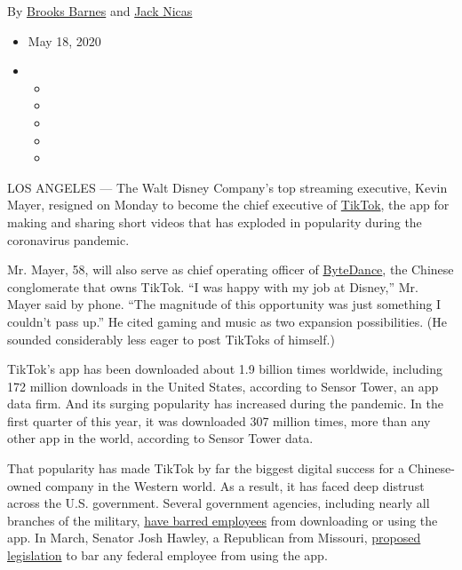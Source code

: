 By \href{https://www.nytimes.com/by/brooks-barnes}{Brooks Barnes} and
\href{https://www.nytimes.com/by/jack-nicas}{Jack Nicas}

\begin{itemize}
\item
  May 18, 2020
\item
  \begin{itemize}
  \item
  \item
  \item
  \item
  \item
  \end{itemize}
\end{itemize}

LOS ANGELES --- The Walt Disney Company's top streaming executive, Kevin
Mayer, resigned on Monday to become the chief executive of
\href{https://www.nytimes.com/2019/10/19/style/high-school-tiktok-clubs.html?searchResultPosition=6}{TikTok},
the app for making and sharing short videos that has exploded in
popularity during the coronavirus pandemic.

Mr. Mayer, 58, will also serve as chief operating officer of
\href{https://www.nytimes.com/2018/10/29/technology/bytedance-app-funding-china.html?searchResultPosition=8}{ByteDance},
the Chinese conglomerate that owns TikTok. ``I was happy with my job at
Disney,'' Mr. Mayer said by phone. ``The magnitude of this opportunity
was just something I couldn't pass up.'' He cited gaming and music as
two expansion possibilities. (He sounded considerably less eager to post
TikToks of himself.)

TikTok's app has been downloaded about 1.9 billion times worldwide,
including 172 million downloads in the United States, according to
Sensor Tower, an app data firm. And its surging popularity has increased
during the pandemic. In the first quarter of this year, it was
downloaded 307 million times, more than any other app in the world,
according to Sensor Tower data.

That popularity has made TikTok by far the biggest digital success for a
Chinese-owned company in the Western world. As a result, it has faced
deep distrust across the U.S. government. Several government agencies,
including nearly all branches of the military,
\href{https://www.nytimes.com/2020/01/04/us/tiktok-pentagon-military-ban.html}{have
barred employees} from downloading or using the app. In March, Senator
Josh Hawley, a Republican from Missouri,
\href{https://www.congress.gov/bill/116th-congress/senate-bill/3455?s=1\&r=1}{proposed
legislation} to bar any federal employee from using the app.

